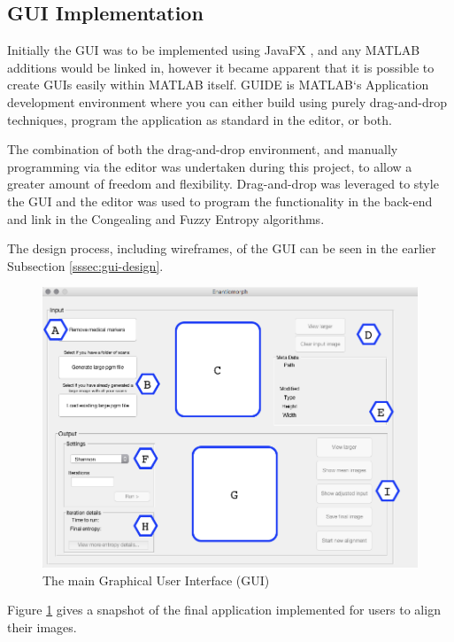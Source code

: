 \subsection{GUI Implementation}
\label{ssec:GUI-implement}

Initially the \acrfull{GUI} was to be implemented using JavaFX \cite{javafx}, and any MATLAB additions would be linked in, however it became apparent that it is possible to create \acrshort{GUI}s easily within MATLAB itself. GUIDE \cite{guide} is MATLAB`s Application development environment where you can either build using purely drag-and-drop techniques, program the application as standard in the editor, or both.

The combination of both the drag-and-drop environment, and manually programming via the editor was undertaken during this project, to allow a greater amount of freedom and flexibility. Drag-and-drop was leveraged to style the \acrshort{GUI} and the editor was used to program the functionality in the back-end and link in the \Gls{Congealing} and Fuzzy Entropy algorithms.

The design process, including wireframes, of the \acrshort{GUI} can be seen in the earlier Subsection \ref{sssec:gui-design}.

\begin{figure}[H]
  \center
  \includegraphics[scale=0.5]{Chapter2/software-img/final_gui.png}
  \caption{The main Graphical User Interface (GUI)}
  \label{fig:final_gui_pic}
\end{figure}

Figure \ref{fig:final_gui_pic} gives a snapshot of the final application implemented for users to align their images.

